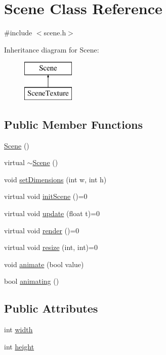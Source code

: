 \hypertarget{class_scene}{}\section{Scene Class Reference}
\label{class_scene}


{\ttfamily \#include $<$scene.\+h$>$}

Inheritance diagram for Scene\+:\begin{figure}[H]
\begin{center}
\leavevmode
\includegraphics[height=2.000000cm]{class_scene}
\end{center}
\end{figure}
\subsection*{Public Member Functions}
\begin{DoxyCompactItemize}
\item 
\mbox{\hyperlink{class_scene_ad10176d75a9cc0da56626f682d083507}{Scene}} ()
\item 
virtual \mbox{\hyperlink{class_scene_aa0a5be58e2ee2d1fdafc5fb46b5e661e}{$\sim$\+Scene}} ()
\item 
void \mbox{\hyperlink{class_scene_a30001708297b0c60e30ae7c43acfb037}{set\+Dimensions}} (int w, int h)
\item 
virtual void \mbox{\hyperlink{class_scene_ae76b830c1156bb40bd744afb63776be2}{init\+Scene}} ()=0
\item 
virtual void \mbox{\hyperlink{class_scene_aafa9ccf4d019005fdd41672afd13a7a9}{update}} (float t)=0
\item 
virtual void \mbox{\hyperlink{class_scene_a823f4cd60d27932ee16f74adb0421ff6}{render}} ()=0
\item 
virtual void \mbox{\hyperlink{class_scene_a454bd0a09c125201fbb32e15d4f62fa3}{resize}} (int, int)=0
\item 
void \mbox{\hyperlink{class_scene_a676f7cbc5f768869e9e5f318b1bc5730}{animate}} (bool value)
\item 
bool \mbox{\hyperlink{class_scene_a72325333f1f2062afc3477b0e325ebec}{animating}} ()
\end{DoxyCompactItemize}
\subsection*{Public Attributes}
\begin{DoxyCompactItemize}
\item 
int \mbox{\hyperlink{class_scene_a99ea310cee6775f4f5bef1940e647cf1}{width}}
\item 
int \mbox{\hyperlink{class_scene_a03e1d101ff6c2dbbe8da3ba812cde0f7}{height}}
\end{DoxyCompactItemize}
